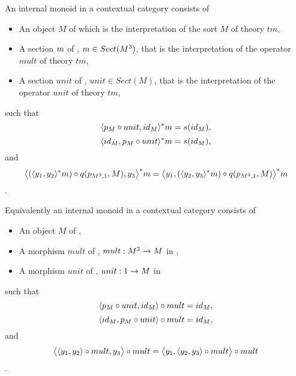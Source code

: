 \begin{lemma}
An internal monoid in a contextual category \catcw consists of
\begin{itemize}
\item An object $M$ of \catcw which is the interpretation of the sort $M$ of theory $tm$,
\item A section $m$ of \catc, $m \in Sect(M^3)$, that is the interpretation of the operator $mult$ of theory $tm$,
\item A section $unit$ of \catc, $unit \in Sect(M)$, that is the interpretation of the operator $unit$ of theory $tm$,
\end{itemize}
such that
\begin{equation}
\label{internalmonoidrepresentation1axiom1}
\langle p_M \circ unit,id_M\rangle^*m=s(id_M),
\end{equation}
\begin{equation}
\label{internalmonoidrepresentation1axiom2}
\langle id_M,p_M \circ unit\rangle^*m=s(id_M),
\end{equation}
and
\begin{equation}
\label{internalmonoidrepresentation1axiom3}
\big \langle (\langle y_1,y_2\rangle^*m)\circ q(p_{M^3,1},M),y_3 \big \rangle^*m
=\big \langle y_1,(\langle y_2,y_3\rangle^*m)\circ q(p_{M^3,1},M) \big \rangle^*m
\end{equation}.

Equivalently an internal monoid in a contextual category \catc consists of
\begin{itemize}
\item An object $M$ of \catc,
\item A morphism $mult$ of \catc, $mult: M^2 \rightarrow M$ in \catc,
\item A morphism $unit$ of \catc, $unit: 1 \rightarrow M$ in \catc
\end{itemize}
such that
\begin{equation}
\label{internalmonoidrepresentation2axiom1}
\langle p_M \circ unit,id_M\rangle\circ mult=id_M,
\end{equation}
\begin{equation}
\label{internalmonoidrepresentation2axiom2}
\langle{id_M,p_M \circ unit}\rangle\circ mult=id_M,
\end{equation}
and
\begin{equation}
\label{internalmonoidrepresentation2axiom3}
\big \langle \langle y_1,y_2\rangle\circ mult,y_3 \big \rangle\circ mult
=\big \langle y_1,\langle y_2,y_3\rangle \circ mult \big \rangle\circ mult
\end{equation}.
\end{lemma}
